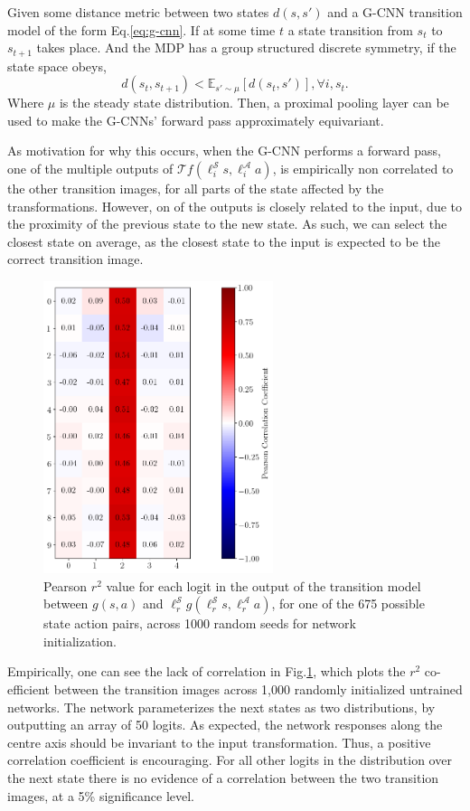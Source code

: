 \begin{proposition}
	Given some distance metric between two states $d(s, s')$ and a G-CNN transition model of the form Eq.\ref{eq:g-cnn}. If at some time $t$ a state transition from $s_t$ to $s_{t+1}$ takes place. And the MDP has a group structured discrete symmetry, if the state space obeys,
	\begin{equation}
		d(s_t, s_{t+1}) < \mathbb{E}_{s'\sim \mu}[d(s_t, s')], \forall i, s_t.
	\end{equation}
	Where $\mu$ is the steady state distribution. Then, a proximal pooling layer can be used to make the G-CNNs' forward pass approximately equivariant.
\end{proposition}
As motivation for why this occurs, when the G-CNN performs a forward pass, one of the multiple outputs of $\mathcal{T} f(\ell_i^\mathcal{S}s,\ell_i^\mathcal{A} a)$, is empirically non correlated to the other transition images, for all parts of the state affected by the transformations. However, on of the outputs is closely related to the input, due to the proximity of the previous state to the new state. As such, we can select the closest state on average, as the closest state to the input is expected to be the correct transition image.
\begin{figure}[h!]
	\centering
	\includegraphics[width = 0.6\textwidth]{Figures/logits_correlation.png}
	\caption{Pearson $r^2$ value for each logit in the output of the transition model between $g(s, a)$ and $\ell_r^\mathcal{S}g(\ell_r^\mathcal{S}s,\ell_r^\mathcal{A}a)$, for one of the 675 possible state action pairs, across 1000 random  seeds for network initialization. }
	\label{fig:logits_correlation}
\end{figure}
Empirically, one can see the lack of correlation in Fig.\ref{fig:logits_correlation}, which plots the $r^2$ co-efficient between the transition images across 1,000 randomly initialized untrained networks. The network parameterizes the next states as two distributions, by outputting an array of 50 logits. As expected, the network responses along the centre axis should be invariant to the input transformation. Thus, a positive correlation coefficient is encouraging. For all other logits in the distribution over the next state there is no evidence of a correlation between the two transition images, at a 5\% significance level.

